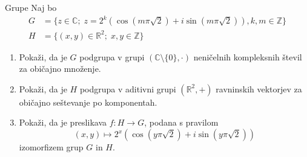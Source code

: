 \begin{frame}{Grupe}
	Naj bo
	\begin{align*}
		G &= \{z\in\mathbb{C};\; z=2^k(\cos(m\pi\sqrt{2})+i\sin(m\pi\sqrt{2})), k,m\in\mathbb{Z}\} \\
		H &= \{(x,y)\in\mathbb{R}^2;\; x,y\in\mathbb{Z}\}
	\end{align*}
	\begin{enumerate}
		\item
			Pokaži, da je $G$ podgrupa v grupi $(\mathbb{C}\setminus\{0\},\cdot)$
			neničelnih kompleksnih števil za običajno množenje.
		\item
			Pokaži, da je $H$ podgrupa v aditivni grupi $(\mathbb{R}^2,+)$
			ravninskih vektorjev za običajno seštevanje po komponentah.
		\item
			Pokaži, da je preslikava $f:H\to G$, podana s pravilom
			$$ (x,y) \mapsto 2^x(\cos(y\pi\sqrt{2})+i\sin(y\pi\sqrt{2})) $$
			izomorfizem grup $G$ in $H$.
	\end{enumerate}
\end{frame}
